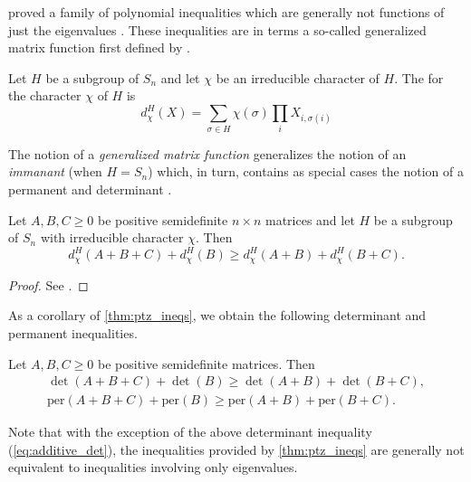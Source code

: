 \documentclass[notitlepage, 10pt]{article}
\begin{document}
\citeauthor{paksoy2014inequalities} proved a family of polynomial inequalities which are generally not functions of just the eigenvalues \cite{paksoy2014inequalities}.
These inequalities are in terms a so-called generalized matrix function first defined by \citeauthor{marcus1965generalized} \cite{marcus1965generalized}.
\begin{defn}
    Let $H$ be a subgroup of $S_n$ and let $\chi$ be an irreducible character of $H$.
    The  for the character $\chi$ of $H$ is
    \begin{equation}
        d_{\chi}^{H}(X) = \sum_{\sigma \in H} \chi(\sigma) \prod_{i} X_{i,\sigma(i)}
    \end{equation}
\end{defn}
The notion of a \textit{generalized matrix function} generalizes the notion of an \textit{immanant} (when $H = S_n$) which, in turn, contains as special cases the notion of a permanent and determinant \cite{huber2021matrix}.
\begin{thm}
    \label{thm:ptz_ineqs}
    Let $A,B,C \geq 0$ be positive semidefinite $n\times n$ matrices and let $H$ be a subgroup of $S_n$ with irreducible character $\chi$.
    Then
    \begin{equation}
        d_{\chi}^{H}(A+B+C) + d_{\chi}^{H}(B) \geq d_{\chi}^{H}(A+B) + d_{\chi}^{H}(B+C).
    \end{equation}
\end{thm}
\begin{proof}
    See \cite{paksoy2014inequalities}.
\end{proof}
As a corollary of \cref{thm:ptz_ineqs}, we obtain the following determinant and permanent inequalities.
\begin{cor}
    Let $A,B,C \geq 0$ be positive semidefinite matrices.
    Then
    \begin{align}
        \det(A+B+C) + \det(B) \geq \det(A+B) + \det(B+C), \label{eq:additive_det}\\
        \mathrm{per}(A+B+C) + \mathrm{per}(B) \geq \mathrm{per}(A+B) + \mathrm{per}(B+C).
    \end{align}
\end{cor}
Note that with the exception of the above determinant inequality (\cref{eq:additive_det}), the inequalities provided by \cref{thm:ptz_ineqs} are generally not equivalent to inequalities involving only eigenvalues.
\end{document}
